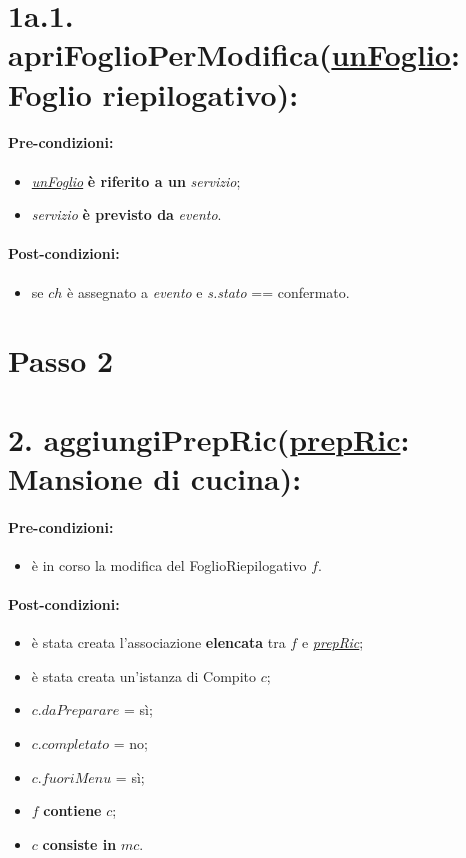 \section*{1a.1. apriFoglioPerModifica(\underline{unFoglio}: Foglio riepilogativo):}

\paragraph{Pre-condizioni:}

\begin{itemize}
  \item \underline{\textit{unFoglio}} \textbf{è riferito a un} \textit{servizio};
  \item \textit{servizio} \textbf{è previsto da} \textit{evento}.
\end{itemize}

\paragraph{Post-condizioni:}

\begin{itemize}
  \item se $ch$ è assegnato a \textit{evento} e \textit{s.stato} == confermato.
\end{itemize}

\section{Passo 2}

\section*{2. aggiungiPrepRic(\underline{prepRic}: Mansione di cucina):}

\paragraph{Pre-condizioni:}

\begin{itemize}
  \item è in corso la modifica del FoglioRiepilogativo $f$.
\end{itemize}

\paragraph{Post-condizioni:}

\begin{itemize}
  \item è stata creata l'associazione \textbf{elencata} tra $f$ e \underline{\textit{prepRic}};
  \item è stata creata un'istanza di Compito $c$;
  \item $c.daPreparare$ = sì;
  \item $c.completato$ = no;
  \item $c.fuoriMenu$ = sì;
  \item $f$ \textbf{contiene} $c$;
  \item $c$ \textbf{consiste in} $mc$.
\end{itemize}

